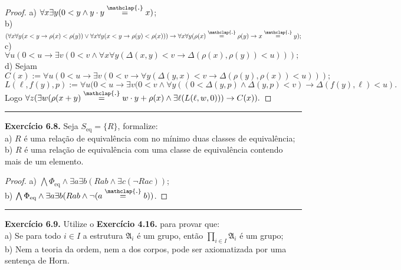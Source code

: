 \documentclass[11pt]{article}
\theoremstyle{definition}
\newcommand{\mf}[1]{\mathfrak{#1}}
\newcommand\overtext[2]{\stackrel{\mathclap{\normalfont\mbox{#1}}}{#2}}
\begin{document}
\begin{proof}
    a) $\forall x\exists y(0<y\wedge y\cdot y\overtext{.}{=}x)$;\\
    b) $(\forall x\forall y(x<y\rightarrow\rho(x)<\rho(y))\vee\forall x\forall y(x<y\rightarrow\rho(y)<\rho(x)))\rightarrow\forall x\forall y(\rho(x)\overtext{.}{=}\rho(y)\rightarrow x\overtext{.}{=}y);$\\
    c) $\forall u(0<u\rightarrow\exists v(0<v\wedge\forall x\forall y(\Delta(x,y)<v\rightarrow\Delta(\rho(x),\rho(y))<u)));$\\
    d) Sejam $$C(x):=\forall u(0<u\rightarrow\exists v(0<v\rightarrow\forall y(\Delta(y,x)<v\rightarrow\Delta(\rho(y),\rho(x))<u)));$$
    $$L(\ell, f(y), p):=\forall u(0<u\rightarrow\exists v(0<v\wedge\forall y((0<\Delta(y,p)\wedge\Delta(y,p)<v)\rightarrow\Delta(f(y),\ell)<u).$$
    Logo $\forall z(\exists w(\rho(x+y)\overtext{.}{=}w\cdot y+\rho(x)\wedge\exists\ell(L(\ell,w,0)))\rightarrow C(x)).$
\end{proof}

\hrule

\textbf{Exercício 6.8.} Seja $S_\text{eq}=\{R\}$, formalize:\\
a) $R$ é uma relação de equivalência com no mínimo duas classes de equivalência;\\
b) $R$ é uma relação de equivalência com uma classe de equivalência contendo mais de um elemento.

\begin{proof}
    a) $\bigwedge\Phi_\text{eq}\wedge\exists a\exists b(Rab\wedge\exists c(\neg Rac))$;\\
    b) $\bigwedge\Phi_\text{eq}\wedge\exists a\exists b(Rab\wedge\neg(a\overtext{.}{=}b))$.
\end{proof}

\hrule

\textbf{Exercício 6.9.} Utilize o \textbf{Exercício 4.16.} para provar que:\\
a) Se para todo $i\in I$ a estrutura $\mf{A}_i$ é um grupo, então $\prod_{i\in I}\mf{A}_i$ é um grupo;\\
b) Nem a teoria da ordem, nem a dos corpos, pode ser axiomatizada por uma sentença de Horn.
\end{document}
